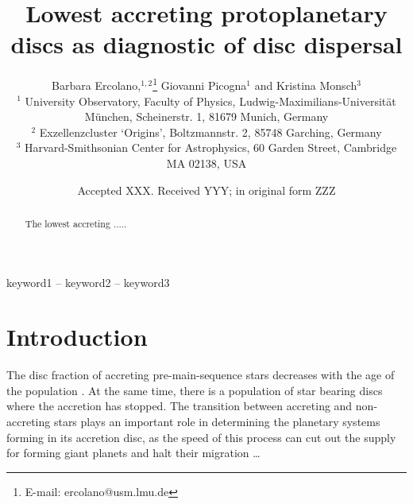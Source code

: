 \documentclass[fleqn,usenatbib,letters]{mnras}
\title[Low accretors and disc dispersal]{Lowest accreting protoplanetary discs as diagnostic of disc dispersal}
\author[B. Ercolano et al.]{
Barbara Ercolano,$^{1,2}$\thanks{E-mail: ercolano@usm.lmu.de}
Giovanni Picogna$^{1}$
and Kristina Monsch$^{3}$
\\
$^{1}$ University Observatory, Faculty of Physics, Ludwig-Maximilians-Universit\"at M\"unchen, Scheinerstr. 1, 81679 Munich, Germany\\
$^{2}$ Exzellenzcluster `Origins', Boltzmannstr. 2, 85748 Garching, Germany\\
$^{3}$ Harvard-Smithsonian Center for Astrophysics, 60 Garden Street, Cambridge MA 02138, USA
}
\date{Accepted XXX. Received YYY; in original form ZZZ}
\begin{document}
\label{firstpage}
\pagerange{\pageref{firstpage}--\pageref{lastpage}}
\maketitle

\begin{abstract}

The lowest accreting ..... 
\end{abstract}

\begin{keywords}
keyword1 -- keyword2 -- keyword3
\end{keywords}



\section{Introduction}

The disc fraction of accreting pre-main-sequence stars decreases with the age of the population \citep[see e.g.][]{Mamajek2009}. At the same time, there is a population of star bearing discs where the accretion has stopped.
The transition between accreting and non-accreting stars plays an important role in determining the planetary systems forming in its accretion disc, as the speed of this process can cut out the supply for forming giant planets and halt their migration \citep[see e.g.][]{Monsch2019}\ldots

\end{document}
